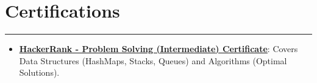 \documentclass[a4paper,10.5pt]{article}
\begin{document}
\section*{Certifications}
\vspace{-.3em}
\hrule
\vspace{0.4em}
\begin{itemize}
    \item \textbf{\href{https://www.hackerrank.com/certificates/0546eb7d14c4}{\underline{HackerRank - Problem Solving (Intermediate) Certificate}}}: Covers Data Structures (HashMaps, Stacks, Queues) and Algorithms (Optimal Solutions).
\end{itemize}
\end{document}
